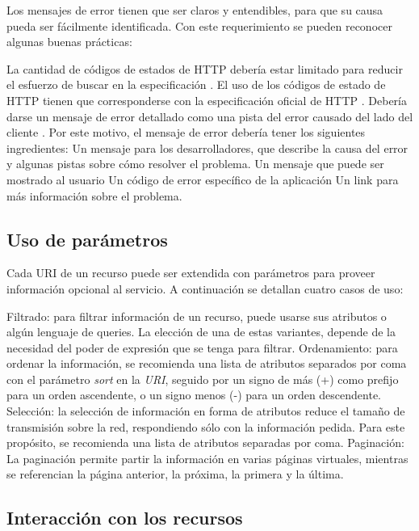 Los mensajes de error tienen que ser claros y entendibles, para que su causa pueda ser fácilmente identificada. Con este requerimiento se pueden reconocer algunas buenas prácticas:
\begin{outline}
    \1 La cantidad de códigos de estados de HTTP debería estar limitado para reducir el esfuerzo de buscar en la especificación \cite{WAPID}.
    \1 El uso de los códigos de estado de HTTP tienen que corresponderse con la especificación oficial de HTTP \cite{HTTP}.
    \1 Debería darse un mensaje de error detallado como una pista del error causado del lado del cliente \cite{WAPID}. Por este motivo, el mensaje de error debería tener los siguientes ingredientes:
        \2 Un mensaje para los desarrolladores, que describe la causa del error y algunas pistas sobre cómo resolver el problema.
        \2 Un mensaje que puede ser mostrado al usuario
        \2 Un código de error específico de la aplicación
        \2 Un link para más información sobre el problema.
\end{outline}
\subsection[Uso de parámetros]{Uso de parámetros}

Cada URI de un recurso puede ser extendida con parámetros para proveer información opcional al servicio. A continuación se detallan cuatro casos de uso:
\begin{outline}
    \1 Filtrado: para filtrar información de un recurso, puede usarse sus atributos o algún lenguaje de queries. La elección de una de estas variantes, depende de la necesidad del poder de expresión que se tenga para filtrar. 
    \1 Ordenamiento: para ordenar la información, se recomienda \cite{BPRA} una lista de atributos separados por coma con el parámetro \textit{sort} en la \textit{URI}, seguido por un signo de más (+) como prefijo para un orden ascendente, o un signo menos (-) para un orden descendente.
    \1 Selección: la selección de información en forma de atributos reduce el tamaño de transmisión sobre la red, respondiendo sólo con la información pedida. Para este propósito, se recomienda una lista de atributos separadas por coma.
    \1 Paginación: La paginación permite partir la información en varias páginas virtuales, mientras se referencian la página anterior, la próxima, la primera y la última. 
\end{outline}
\subsection[Interacción con los recursos]{Interacción con los recursos}

